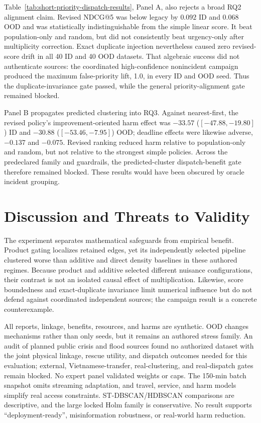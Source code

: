 \documentclass[runningheads]{llncs}
\begin{document}
\ShortPriorityDispatchResultsTable

Table~\ref{tab:short-priority-dispatch-results}, Panel A, also rejects a broad
RQ2 alignment claim. Revised NDCG@5 was below legacy by $0.092$ ID and $0.068$
OOD and was statistically indistinguishable from the simple linear score. It
beat population-only and random, but did not consistently beat urgency-only
after multiplicity correction. Exact duplicate injection nevertheless caused
zero revised-score drift in all 40 ID and 40 OOD datasets. That algebraic
success did not authenticate sources: the coordinated high-confidence
nonincident campaign produced the maximum false-priority lift, 1.0, in every
ID and OOD seed. Thus the duplicate-invariance gate passed, while the general
priority-alignment gate remained blocked.

Panel B propagates predicted clustering into RQ3. Against nearest-first, the
revised policy's improvement-oriented harm effect was $-33.57$
($[-47.88,-19.80]$) ID and $-30.88$ ($[-53.46,-7.95]$) OOD; deadline effects
were likewise adverse, $-0.137$ and $-0.075$. Revised ranking reduced harm
relative to population-only and random, but not relative to the strongest
simple policies. Across the predeclared family and guardrails, the
predicted-cluster dispatch-benefit gate therefore remained blocked. These
results would have been obscured by oracle incident grouping.

\section{Discussion and Threats to Validity}

The experiment separates mathematical safeguards from empirical benefit.
Product gating localizes retained edges, yet its independently selected
pipeline clustered worse than additive and direct density baselines in these
authored regimes. Because product and additive selected different nuisance
configurations, their contrast is not an isolated causal effect of
multiplication. Likewise, score boundedness and exact-duplicate invariance
limit numerical influence but do not defend against coordinated independent
sources; the campaign result is a concrete counterexample.

All reports, linkage, benefits, resources, and harms are synthetic. OOD changes
mechanisms rather than only seeds, but it remains an authored stress family.
An audit of planned public crisis and flood sources found no authorized dataset
with the joint physical linkage, rescue utility, and dispatch outcomes needed
for this evaluation; external, Vietnamese-transfer, real-clustering, and
real-dispatch gates remain blocked. No expert panel validated weights or caps.
The 150-min batch snapshot omits streaming adaptation, and travel, service, and
harm models simplify real access constraints. ST-DBSCAN/HDBSCAN comparisons
are descriptive, and the large locked Holm family is conservative. No result
supports ``deployment-ready'', misinformation robustness, or real-world harm
reduction.
\end{document}
